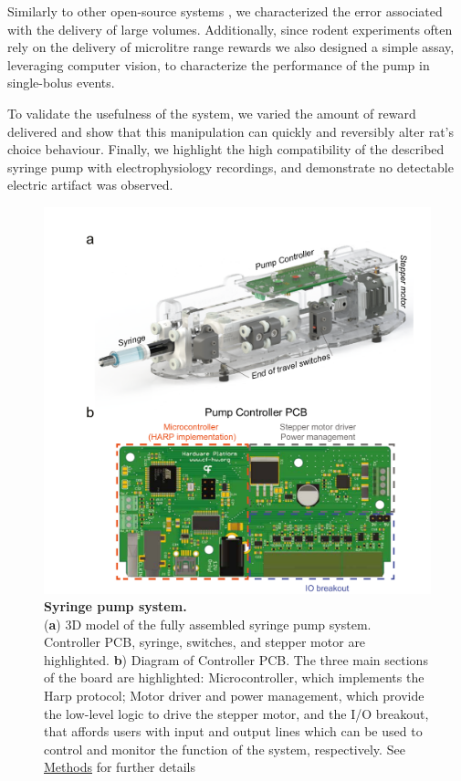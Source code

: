 Similarly to other open-source systems \citep{Wijnen2014, Amarante2019}, we characterized the error associated with the delivery of large volumes. Additionally, since rodent experiments often rely on the delivery of microlitre range rewards we also designed a simple assay, leveraging computer vision, to characterize the performance of the pump in single-bolus events.

To validate the usefulness of the system, we varied the amount of reward delivered and show that this manipulation can quickly and reversibly alter rat's choice behaviour. Finally, we highlight the high compatibility of the described syringe pump with electrophysiology recordings, and demonstrate no detectable electric artifact was observed.


\begin{figure}
	\centering
	\includegraphics[width=1.0\linewidth]{Figures/Artboard 1.pdf}
	\caption{\textbf{Syringe pump system.}\\
		(\textbf{a}) 3D model of the fully assembled syringe pump system. Controller PCB, syringe, switches, and stepper motor are highlighted.  \textbf{b}) Diagram of Controller PCB. The three main sections of the board are highlighted: Microcontroller, which implements the Harp protocol; Motor driver and power management, which provide the low-level logic to drive the stepper motor, and the I/O breakout, that affords users with input and output lines which can be used to control and monitor the function of the system, respectively. See \hyperref[s:methods]{Methods} for further details}
	\label{fig:PumpDrawing}
\end{figure}

